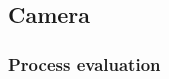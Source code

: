\documentclass[journal,twoside]{JoPhA}
\begin{document}



% 
% 





\subsection{Camera}

\subsubsection{Process evaluation}
\end{document}

